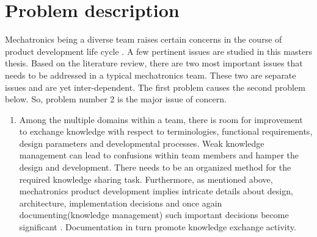\section{Problem description}
\label{pd}
Mechatronics being a diverse team raises certain concerns in the course of product development life cycle \cite{bitzer2016product}\cite{neumann_mechatronic_nodate}. A few pertinent issues are studied in this masters thesis. Based on the literature review, there are two most important issues that needs to be addressed in a typical mechatronics team. These two are separate issues and are yet inter-dependent. The first problem causes the second problem below. So, problem number 2 is the major issue of concern.
\begin{enumerate}
\item  Among the multiple domains within a team, there is room for improvement to exchange knowledge with respect to terminologies, functional requirements, design parameters and developmental processes. Weak knowledge management can lead to confusions within team members and hamper the design and development. There needs to be an organized method for the required knowledge sharing task. Furthermore, as mentioned above, mechatronics product development implies intricate details about design, architecture, implementation decisions and once again documenting(knowledge management) such important decisions become significant \cite{neumann_mechatronic_nodate}. Documentation in turn promote knowledge exchange activity.


\end{enumerate}
